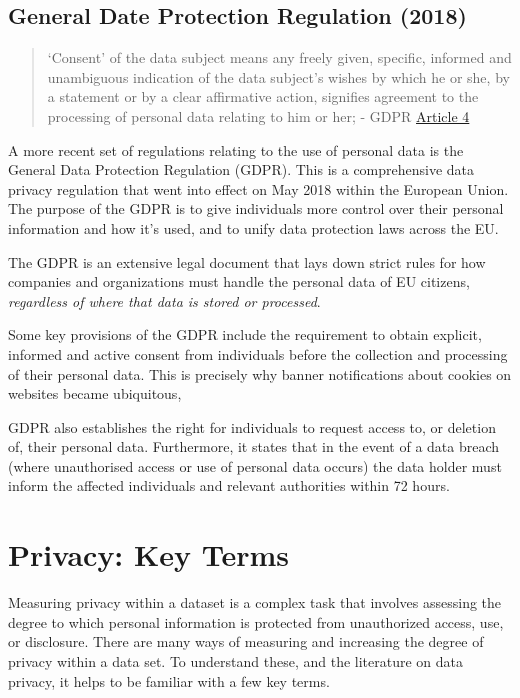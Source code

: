 \documentclass[
  12pt,
]{book}
\begin{document}
\hypertarget{general-date-protection-regulation-2018}{%
\subsection{General Date Protection Regulation (2018)}\label{general-date-protection-regulation-2018}}

\begin{quote}
`Consent' of the data subject means any freely given, specific, informed and unambiguous indication of the data subject's wishes by which he or she, by a statement or by a clear affirmative action, signifies agreement to the processing of personal data relating to him or her; - GDPR \href{https://gdpr-info.eu/art-4-gdpr/}{Article 4}
\end{quote}

A more recent set of regulations relating to the use of personal data is the General Data Protection Regulation (GDPR). This is a comprehensive data privacy regulation that went into effect on May 2018 within the European Union. The purpose of the GDPR is to give individuals more control over their personal information and how it's used, and to unify data protection laws across the EU.

The GDPR is an extensive legal document that lays down strict rules for how companies and organizations must handle the personal data of EU citizens, \emph{regardless of where that data is stored or processed}.

Some key provisions of the GDPR include the requirement to obtain explicit, informed and active consent from individuals before the collection and processing of their personal data. This is precisely why banner notifications about cookies on websites became ubiquitous,

GDPR also establishes the right for individuals to request access to, or deletion of, their personal data. Furthermore, it states that in the event of a data breach (where unauthorised access or use of personal data occurs) the data holder must inform the affected individuals and relevant authorities within 72 hours.

\hypertarget{privacy-key-terms}{%
\section{Privacy: Key Terms}\label{privacy-key-terms}}

Measuring privacy within a dataset is a complex task that involves assessing the degree to which personal information is protected from unauthorized access, use, or disclosure. There are many ways of measuring and increasing the degree of privacy within a data set. To understand these, and the literature on data privacy, it helps to be familiar with a few key terms.
\end{document}
